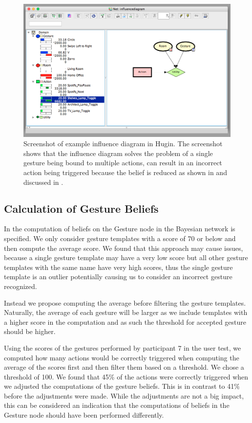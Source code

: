 \begin{figure}[h]
\centering
\includegraphics[width=\textwidth]{images/hugin-influence-diagram}
\caption{Screenshot of example influence diagram in Hugin. The screenshot shows that the influence diagram solves the problem of a single gesture being bound to multiple actions, can result in an incorrect action being triggered because the belief is reduced as shown in  and discussed in .}
\label{fig:evaluation:alternative-models:hugin-influence-diagram}
\end{figure}

\subsection{Calculation of Gesture Beliefs}

In  the computation of beliefs on the Gesture node in the Bayesian network is specified. We only consider gesture templates with a score of 70 or below and then compute the average score. We found that this approach may cause issues, because a single gesture template may have a very low score but all other gesture templates with the same name have very high scores, thus the single gesture template is an outlier potentially causing us to consider an incorrect gesture recognized.

Instead we propose computing the average before filtering the gesture templates. Naturally, the average of each gesture will be larger as we include templates with a higher score in the computation and as such the threshold for accepted gesture should be higher.

Using the scores of the gestures performed by participant 7 in the user test, we computed how many actions would be correctly triggered when computing the average of the scores first and then filter them based on a threshold. We chose a threshold of 100. We found that 45\% of the actions were correctly triggered when we adjusted the computations of the gesture beliefs. This is in contrast to 41\% before the adjustments were made. While the adjustments are not a big impact, this can be considered an indication that the computations of beliefs in the Gesture node should have been performed differently.

